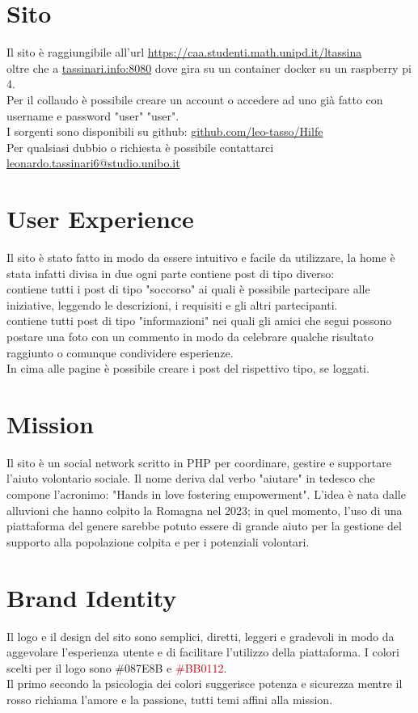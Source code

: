 \section{Sito}
Il sito è raggiungibile all'url \href{https://caa.studenti.math.unipd.it/ltassina}{https://caa.studenti.math.unipd.it/ltassina}\\
oltre che a \href{http://tassinari.info:8080}{tassinari.info:8080} dove gira su un container docker su un raspberry pi 4.\\
Per il collaudo è possibile creare un account o accedere ad uno già fatto con username e password "user" "user".\\
I sorgenti sono disponibili su github: \href{https://github.com/leo-tasso/Hilfe}{github.com/leo-tasso/Hilfe}\\
Per qualsiasi dubbio o richiesta è possibile contattarci \href{mailto:leonardo.tassinari6@studio.unibo.it}{leonardo.tassinari6@studio.unibo.it}
\section{User Experience}
Il sito è stato fatto in modo da essere intuitivo e facile da utilizzare, la home è stata infatti divisa in due ogni parte contiene post di tipo diverso:\\
 contiene tutti i post di tipo "soccorso" ai quali è possibile partecipare alle iniziative, leggendo le descrizioni, i requisiti e gli altri partecipanti.\\
 contiene tutti post di tipo "informazioni" nei quali gli amici che segui possono postare una foto con un commento in modo da celebrare qualche risultato raggiunto o comunque condividere esperienze.\\
In cima alle pagine è possibile creare i post del rispettivo tipo, se loggati.
\section{Mission}
Il sito è un social network scritto in PHP per coordinare, gestire e supportare l'aiuto volontario sociale. Il nome deriva dal verbo "aiutare" in tedesco che compone l'acronimo: "Hands in love fostering empowerment".
L'idea è nata dalle alluvioni che hanno colpito la Romagna nel 2023; in quel momento, l'uso di una piattaforma del genere sarebbe potuto essere di grande aiuto per la gestione del supporto alla popolazione colpita e per i potenziali volontari.
\section{Brand Identity}
Il logo e il design del sito sono semplici, diretti, leggeri e gradevoli in modo da aggevolare l'esperienza utente e di facilitare l'utilizzo della piattaforma.
I colori scelti per il logo sono \textcolor[HTML]{087E8B}{\#087E8B} e \textcolor[HTML]{BB0112}{\#BB0112}.\\
Il primo secondo la psicologia dei colori suggerisce potenza e sicurezza mentre il rosso richiama l'amore e la passione, tutti temi affini alla mission.
\pagebreak
